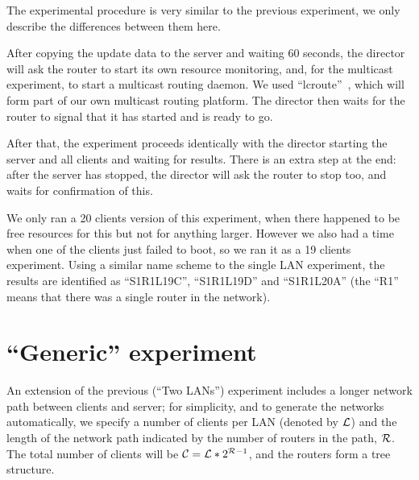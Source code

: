 \documentclass[a4paper,11pt,twocolumn]{article}
\begin{document}
The experimental procedure is very similar to the previous experiment,
we only describe the differences between them here.

After copying the update data to the server and waiting 60 seconds, the
director will ask the router to start its own resource monitoring, and,
for the multicast experiment, to start a multicast routing daemon. We
used ``lcroute''~\cite{lcroute:sources}, which will form part of our
own multicast routing platform. The director then waits for the router
to signal that it has started and is ready to go.

After that, the experiment proceeds identically with the director starting
the server and all clients and waiting for results.  There is an extra step
at the end: after the server has stopped, the director will ask the router
to stop too, and waits for confirmation of this.

We only ran a 20 clients version of this experiment, when there happened
to be free resources for this but not for anything larger. However we also
had a time when one of the clients just failed to boot, so we ran it as
a 19 clients experiment.  Using a similar name scheme to the single LAN
experiment, the results are identified as ``S1R1L19C'', ``S1R1L19D''
and ``S1R1L20A'' (the ``R1'' means that there was a single router in
the network).

\section{``Generic'' experiment}
\label{GEN:experiment}

An extension of the previous (``Two LANs'') experiment includes a longer
network path between clients and server; for simplicity, and to generate
the networks automatically, we specify a number of clients per LAN
(denoted by ${\cal L}$) and the length of the network path indicated by
the number of routers in the path, ${\cal R}$. The total number of clients
will be ${\cal C} = {\cal L} * 2^{{\cal R} - 1}$, and the routers form a
tree structure.
\end{document}
